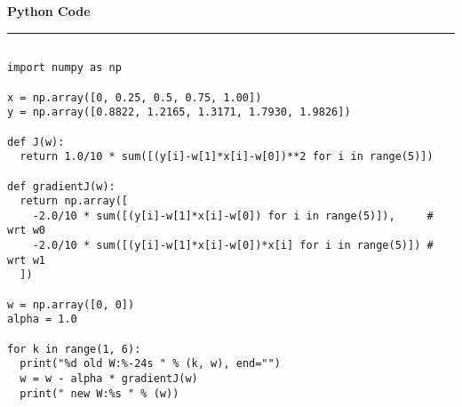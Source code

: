 \documentclass[12pt]{article}
\begin{document}
\break
{\Large \textbf{Python Code}} \\
\rule{\textwidth}{1pt}
\begin{verbatim}

import numpy as np

x = np.array([0, 0.25, 0.5, 0.75, 1.00])
y = np.array([0.8822, 1.2165, 1.3171, 1.7930, 1.9826])

def J(w):
  return 1.0/10 * sum([(y[i]-w[1]*x[i]-w[0])**2 for i in range(5)])
    
def gradientJ(w):
  return np.array([
    -2.0/10 * sum([(y[i]-w[1]*x[i]-w[0]) for i in range(5)]),     # wrt w0
    -2.0/10 * sum([(y[i]-w[1]*x[i]-w[0])*x[i] for i in range(5)]) # wrt w1
  ])
  
w = np.array([0, 0])
alpha = 1.0

for k in range(1, 6):
  print("%d old W:%-24s " % (k, w), end="")
  w = w - alpha * gradientJ(w)
  print(" new W:%s " % (w))

\end{verbatim}
\end{document}
